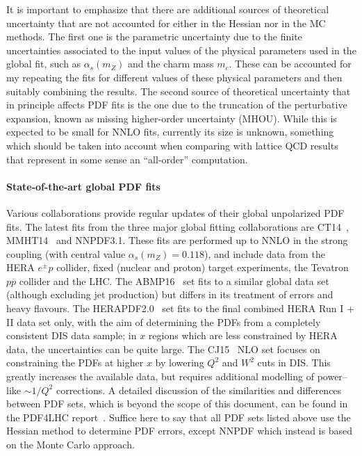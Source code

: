 It is important to emphasize that there are additional sources of theoretical
uncertainty that are not accounted for either in the Hessian nor
in the MC methods.
%
The first one is the parametric uncertainty due to the finite uncertainties associated
to the input values of the physical parameters used in the global fit, such
as $\alpha_s(m_Z)$ and the charm mass $m_c$.
%
These can be accounted for my repeating the fits for different values of these
physical parameters and then suitably combining the results.
%
The second source of theoretical uncertainty that in principle affects PDF fits
is the one due to the truncation of the perturbative expansion, known
as missing higher-order uncertainty (MHOU).
%
While this is expected to be small for NNLO fits, currently its size is unknown,
something which should be taken into account when comparing with lattice
QCD results that represent in some sense an ``all-order'' computation.

\paragraph{State-of-the-art global PDF fits}
%
Various collaborations provide regular updates of their global unpolarized
PDF fits.
%
The latest fits from the three major global fitting collaborations
are CT14~\cite{Dulat:2015mca}, MMHT14~\cite{Harland-Lang:2014zoa} and NNPDF3.1.
%
These fits are performed up to NNLO in the strong coupling (with central value
$\alpha_s(m_Z)=0.118$),
and include data from the HERA $e^{\pm} p$ collider, fixed (nuclear and proton) target experiments, the Tevatron $p\overline{p}$ collider and the LHC. 
%
The ABMP16~\cite{Alekhin:2017kpj} set fits to a similar global data set
(although excluding jet production)
but differs in its treatment of errors and heavy flavours.
%
The HERAPDF2.0~\cite{Abramowicz:2015mha} set fits to the final combined HERA Run I + II data set only, with the aim of determining the PDFs from a completely consistent DIS data sample; in $x$ regions which are less constrained by HERA data, the uncertainties can be quite large. The CJ15~\cite{Accardi:2016qay} NLO set focuses on constraining the PDFs at higher $x$ by lowering $Q^2$ and $W^2$ cuts in DIS. This greatly increases the available data, but requires additional modelling of power--like $\sim 1/Q^2$ corrections.
%
A detailed discussion of the similarities and differences between
PDF sets, which is beyond the scope of this document,
can be found in the PDF4LHC report~\cite{Butterworth:2015oua}.
%
Suffice here to say that all PDF sets listed above use the Hessian
method to determine PDF errors, except NNPDF which instead
is based on the Monte Carlo approach.

